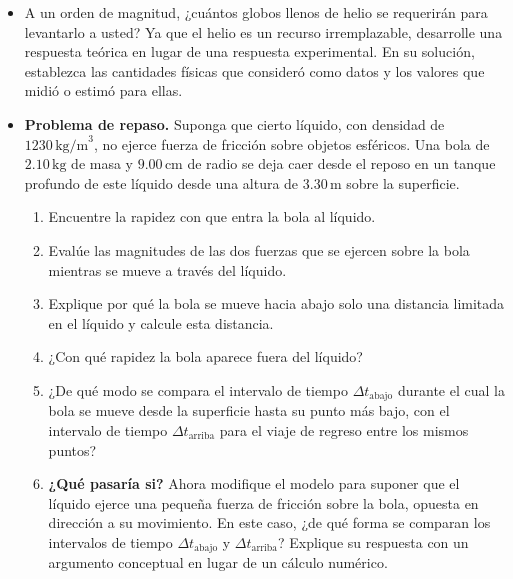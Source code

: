 \documentclass[11pt,a4paper]{article}
\begin{document}
\begin{itemize}
    \item[\textbf{35.}] A un orden de magnitud, ¿cuántos globos llenos de helio se requerirán para levantarlo a usted? Ya que el helio es un recurso irremplazable, desarrolle una respuesta teórica en lugar de una respuesta experimental. En su solución, establezca las cantidades físicas que consideró como datos y los valores que midió o estimó para ellas.
    \vspace*{6cm}
    
    \item[\textbf{36.}] \textbf{Problema de repaso.} Suponga que cierto líquido, con densidad de \(1230\,\text{kg/m}^3\), no ejerce fuerza de fricción sobre objetos esféricos. Una bola de \(2.10\,\text{kg}\) de masa y \(9.00\,\text{cm}\) de radio se deja caer desde el reposo en un tanque profundo de este líquido desde una altura de \(3.30\,\text{m}\) sobre la superficie.
    \begin{enumerate}
        \item Encuentre la rapidez con que entra la bola al líquido.
        \item Evalúe las magnitudes de las dos fuerzas que se ejercen sobre la bola mientras se mueve a través del líquido.
        \item Explique por qué la bola se mueve hacia abajo solo una distancia limitada en el líquido y calcule esta distancia.
        \item ¿Con qué rapidez la bola aparece fuera del líquido?
        \item ¿De qué modo se compara el intervalo de tiempo \(\Delta t_{\text{abajo}}\) durante el cual la bola se mueve desde la superficie hasta su punto más bajo, con el intervalo de tiempo \(\Delta t_{\text{arriba}}\) para el viaje de regreso entre los mismos puntos?
        \item \textbf{¿Qué pasaría si?} Ahora modifique el modelo para suponer que el líquido ejerce una pequeña fuerza de fricción sobre la bola, opuesta en dirección a su movimiento. En este caso, ¿de qué forma se comparan los intervalos de tiempo \(\Delta t_{\text{abajo}}\) y \(\Delta t_{\text{arriba}}\)? Explique su respuesta con un argumento conceptual en lugar de un cálculo numérico.
    \end{enumerate}
    \vspace*{8cm}
    

\end{itemize}
\end{document}
